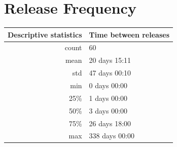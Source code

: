 \cleardoublepage
\changepapersize{305.3mm:210mm}

\thispagestyle{empty}
\begingroup
\raggedright 
{}
\section*{Release Frequency} 
\fontsize{12pt}{14pt}\selectfont
{}
\endgroup

\newpage
{}

\begin{multicols}{3}
	\noindent
	\begin{minipage}{\columnwidth + \columnsep}
		\begin{tabular}{|r|l|}
			\hline
			Descriptive statistics & Time between releases \\
			\hline
			count                  & 60                    \\
			mean                   & 20 days 15:11         \\
			std                    & 47 days 00:10         \\
			min                    & 0 days 00:00          \\
			25\%                   & 1 days 00:00          \\
			50\%                   & 3 days 00:00          \\
			75\%                   & 26 days 18:00         \\
			max                    & 338 days 00:00        \\
			\hline
		\end{tabular}
		\label{tab:release-statistics}
	\end{minipage}
	\columnbreak
	\noindent
	\begin{minipage}{\columnwidth}
		\label{fig:releases-histogram}
	\end{minipage}
\end{multicols}

